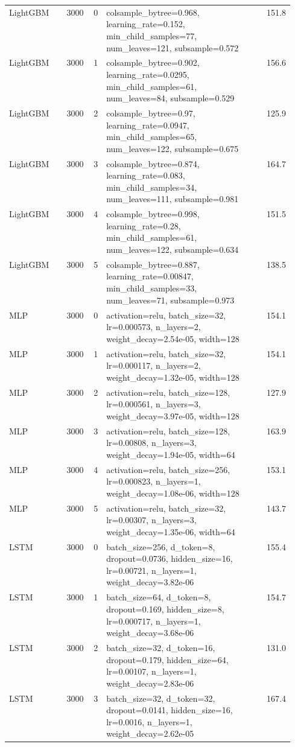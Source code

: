 \begin{longtable}{lrrp{0.55\linewidth}r}
LightGBM & 3000 & 0 & colsample\_bytree=0.968, learning\_rate=0.152, min\_child\_samples=77, num\_leaves=121, subsample=0.572 & 151.8 \\
LightGBM & 3000 & 1 & colsample\_bytree=0.902, learning\_rate=0.0295, min\_child\_samples=61, num\_leaves=84, subsample=0.529 & 156.6 \\
LightGBM & 3000 & 2 & colsample\_bytree=0.97, learning\_rate=0.0947, min\_child\_samples=65, num\_leaves=122, subsample=0.675 & 125.9 \\
LightGBM & 3000 & 3 & colsample\_bytree=0.874, learning\_rate=0.083, min\_child\_samples=34, num\_leaves=111, subsample=0.981 & 164.7 \\
LightGBM & 3000 & 4 & colsample\_bytree=0.998, learning\_rate=0.28, min\_child\_samples=61, num\_leaves=122, subsample=0.634 & 151.5 \\
LightGBM & 3000 & 5 & colsample\_bytree=0.887, learning\_rate=0.00847, min\_child\_samples=33, num\_leaves=71, subsample=0.973 & 138.5 \\
MLP & 3000 & 0 & activation=relu, batch\_size=32, lr=0.000573, n\_layers=2, weight\_decay=2.54e-05, width=128 & 154.1 \\
MLP & 3000 & 1 & activation=relu, batch\_size=32, lr=0.000117, n\_layers=2, weight\_decay=1.32e-05, width=128 & 154.1 \\
MLP & 3000 & 2 & activation=relu, batch\_size=128, lr=0.000561, n\_layers=3, weight\_decay=3.97e-05, width=128 & 127.9 \\
MLP & 3000 & 3 & activation=relu, batch\_size=128, lr=0.00808, n\_layers=3, weight\_decay=1.94e-05, width=64 & 163.9 \\
MLP & 3000 & 4 & activation=relu, batch\_size=256, lr=0.000823, n\_layers=1, weight\_decay=1.08e-06, width=128 & 153.1 \\
MLP & 3000 & 5 & activation=relu, batch\_size=32, lr=0.00307, n\_layers=3, weight\_decay=1.35e-06, width=64 & 143.7 \\
LSTM & 3000 & 0 & batch\_size=256, d\_token=8, dropout=0.0736, hidden\_size=16, lr=0.00721, n\_layers=1, weight\_decay=3.82e-06 & 155.4 \\
LSTM & 3000 & 1 & batch\_size=64, d\_token=8, dropout=0.169, hidden\_size=8, lr=0.000717, n\_layers=1, weight\_decay=3.68e-06 & 154.7 \\
LSTM & 3000 & 2 & batch\_size=32, d\_token=16, dropout=0.179, hidden\_size=64, lr=0.00107, n\_layers=1, weight\_decay=2.83e-06 & 131.0 \\
LSTM & 3000 & 3 & batch\_size=32, d\_token=32, dropout=0.0141, hidden\_size=16, lr=0.0016, n\_layers=1, weight\_decay=2.62e-05 & 167.4 \\

\end{longtable}
